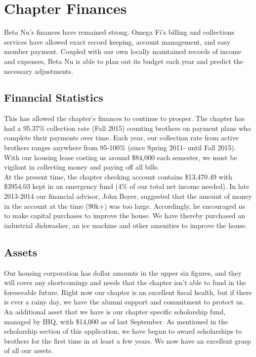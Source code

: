 \chapter{Chapter Finances}

  Beta Nu's finances have remained strong. Omega Fi's billing and collections services have allowed exact record keeping, account management, and easy member payment. Coupled with our own locally maintained records of income and expenses, Beta Nu is able to plan out its budget each year and predict the necessary adjustments.

  \section*{Financial Statistics}
    This has allowed the chapter's finances to continue to prosper. The chapter has had a 95.37\% collection rate (Fall 2015) counting brothers on payment plans who complete their payments over time. Each year, our collection rate from active brothers ranges anywhere from 95-100\% (since Spring 2011- until Fall 2015). With our housing lease costing us around \$84,000 each semester, we must be vigilant in collecting money and paying off all bills. \\

    At the present time, the chapter checking account contains \$13,470.49 with \$3954.03 kept in an emergency fund (4\% of our total net income needed). In late 2013-2014 our financial advisor, John Boyer, suggested that the amount of money in the account at the time (90k+) was too large. Accordingly, he encouraged us to make capital purchases to improve the house. We have thereby purchased an industrial dishwasher, an ice machine and other amenities to improve the house.
    
  \section*{Assets}
    Our housing corporation has dollar amounts in the upper six figures, and they will cover any shortcomings and needs that the chapter isn't able to fund in the foreseeable future. Right now our chapter is an excellent fiscal health, but if there is ever a rainy day, we have the alumni support and commitment to protect us. An additional asset that we have is our chapter specific scholarship fund, managed by IHQ, with \$14,000 as of last September. As mentioned in the scholarship section of this application, we have begun to award scholarships to brothers for the first time in at least a few years. We now have an excellent grasp of all our assets.
    
